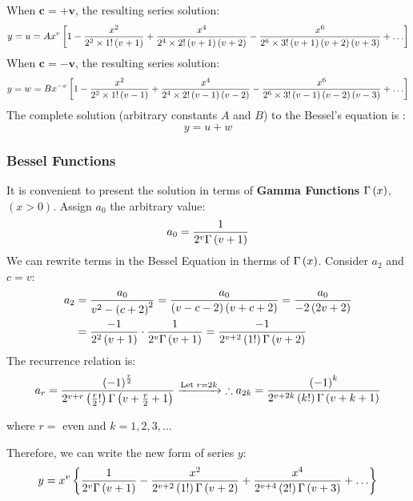 \noindent When $\mathbf{c=+v}$, the resulting series solution:
\begin{equation}
    y=u=Ax^v\left[1-\frac{x^2}{2^2\times1!\left(v+1\right)}+\frac{x^4}{2^4\times2!\left(v+1\right)\left(v+2\right)}-\frac{x^6}{2^6\times3!\left(v+1\right)\left(v+2\right)\left(v+3\right)}+\ldots\right]
\end{equation}
When {$\mathbf{c=-v}$}, the resulting series solution:
\begin{equation}
    y=w=Bx^{-v}\left[1-\frac{x^2}{2^2\times1!\left(v-1\right)}+\frac{x^4}{2^4\times2!\left(v-1\right)\left(v-2\right)}-\frac{x^6}{2^6\times3!\left(v-1\right)\left(v-2\right)\left(v-3\right)}+\ldots\right]
\end{equation}
The complete solution (arbitrary constants $A$ and $B$) to the Bessel's equation is :
\begin{equation}
    y=u+w
\end{equation}
\subsubsection{Bessel Functions}
It is convenient to present the solution in terms of \textbf{Gamma Functions} $\Gamma\left(x\right)$, $(x>0)$. Assign $a_0$ the arbitrary value:
\begin{equation}
    a_0=\frac{1}{2^v\Gamma\left(v+1\right)}
\end{equation}
We can rewrite terms in the Bessel Equation in therms of $\Gamma\left(x\right)$. Consider $a_2$ and $c=v$:
\begin{align*}
    a_2&=\frac{a_0}{v^2-\left(c+2\right)^2}=\frac{a_0}{\left(v-c-2\right)\left(v+c+2\right)}=\frac{a_0}{-2\left(2v+2\right)}\\
    &=\frac{-1}{2^2\left(v+1\right)}\cdot\frac{1}{2^v\Gamma\left(v+1\right)}=\frac{-1}{2^{v+2}\left(1!\right)\Gamma\left(v+2\right)}
\end{align*}
The recurrence relation is:
\begin{align}
    a_r=\frac{\left(-1\right)^{\frac{r}{2}}}{2^{v+r}\left(\frac{r}{2}!\right)\Gamma\left(v+\frac{r}{2}+1\right)}\xrightarrow{\text{Let }r=2k}\ \therefore a_{2k}=\frac{\left(-1\right)^k}{2^{v+2k}\left(k!\right)\Gamma\left(v+k+1\right)}
\end{align}
\begin{center}
    where $r=$ even and $k=1,2,3,\ldots$
\end{center}
Therefore, we can write the new form of series $y$:
\begin{equation}
    y=x^v\left\{\frac{1}{2^v\Gamma\left(v+1\right)}-\frac{x^2}{2^{v+2}\left(1!\right)\Gamma\left(v+2\right)}+\frac{x^4}{2^{v+4}\left(2!\right)\Gamma\left(v+3\right)}+\ldots\right\}
\end{equation}
